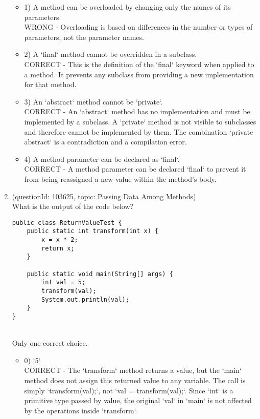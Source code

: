 \documentclass[12pt]{article}
\begin{document}
\begin{enumerate}[label=(\arabic*)]
\begin{itemize}
\item 1) A method can be overloaded by changing only the names of its parameters.
 \\ 
WRONG - Overloading is based on differences in the number or types of parameters, not the parameter names.

\item 2) A `final` method cannot be overridden in a subclass.
 \\ 
CORRECT - This is the definition of the `final` keyword when applied to a method. It prevents any subclass from providing a new implementation for that method.

\item 3) An `abstract` method cannot be `private`.
 \\ 
CORRECT - An `abstract` method has no implementation and must be implemented by a subclass. A `private` method is not visible to subclasses and therefore cannot be implemented by them. The combination `private abstract` is a contradiction and a compilation error.

\item 4) A method parameter can be declared as `final`.
 \\ 
CORRECT - A method parameter can be declared `final` to prevent it from being reassigned a new value within the method's body.

\end{itemize}
\item (questionId: 103625, topic: Passing Data Among Methods) \\ 
What is the output of the code below?
\begin{verbatim}
public class ReturnValueTest {
    public static int transform(int x) {
        x = x * 2;
        return x;
    }

    public static void main(String[] args) {
        int val = 5;
        transform(val);
        System.out.println(val);
    }
}
\end{verbatim}
\\ \noindent Only one correct choice. 
\begin{itemize}
\item 0) `5`
 \\ 
CORRECT - The `transform` method returns a value, but the `main` method does not assign this returned value to any variable. The call is simply `transform(val);`, not `val = transform(val);`. Since `int` is a primitive type passed by value, the original `val` in `main` is not affected by the operations inside `transform`.


\end{itemize}
\end{enumerate}
\end{document}
